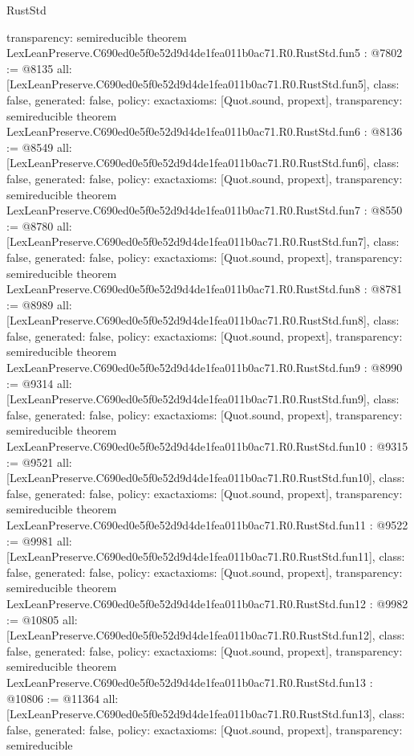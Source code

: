 \begin{lexlean}{RustStd}
\begin{coremodule}
{  transparency: semireducible
}
theorem LexLeanPreserve.C690ed0e5f0e52d9d4de1fea011b0ac71.R0.RustStd.fun5 : @7802 := @8135 {
  all: [LexLeanPreserve.C690ed0e5f0e52d9d4de1fea011b0ac71.R0.RustStd.fun5],
  class: false,
  generated: false,
  policy: exact{axioms: [Quot.sound, propext]},
  transparency: semireducible
}
theorem LexLeanPreserve.C690ed0e5f0e52d9d4de1fea011b0ac71.R0.RustStd.fun6 : @8136 := @8549 {
  all: [LexLeanPreserve.C690ed0e5f0e52d9d4de1fea011b0ac71.R0.RustStd.fun6],
  class: false,
  generated: false,
  policy: exact{axioms: [Quot.sound, propext]},
  transparency: semireducible
}
theorem LexLeanPreserve.C690ed0e5f0e52d9d4de1fea011b0ac71.R0.RustStd.fun7 : @8550 := @8780 {
  all: [LexLeanPreserve.C690ed0e5f0e52d9d4de1fea011b0ac71.R0.RustStd.fun7],
  class: false,
  generated: false,
  policy: exact{axioms: [Quot.sound, propext]},
  transparency: semireducible
}
theorem LexLeanPreserve.C690ed0e5f0e52d9d4de1fea011b0ac71.R0.RustStd.fun8 : @8781 := @8989 {
  all: [LexLeanPreserve.C690ed0e5f0e52d9d4de1fea011b0ac71.R0.RustStd.fun8],
  class: false,
  generated: false,
  policy: exact{axioms: [Quot.sound, propext]},
  transparency: semireducible
}
theorem LexLeanPreserve.C690ed0e5f0e52d9d4de1fea011b0ac71.R0.RustStd.fun9 : @8990 := @9314 {
  all: [LexLeanPreserve.C690ed0e5f0e52d9d4de1fea011b0ac71.R0.RustStd.fun9],
  class: false,
  generated: false,
  policy: exact{axioms: [Quot.sound, propext]},
  transparency: semireducible
}
theorem LexLeanPreserve.C690ed0e5f0e52d9d4de1fea011b0ac71.R0.RustStd.fun10 : @9315 := @9521 {
  all: [LexLeanPreserve.C690ed0e5f0e52d9d4de1fea011b0ac71.R0.RustStd.fun10],
  class: false,
  generated: false,
  policy: exact{axioms: [Quot.sound, propext]},
  transparency: semireducible
}
theorem LexLeanPreserve.C690ed0e5f0e52d9d4de1fea011b0ac71.R0.RustStd.fun11 : @9522 := @9981 {
  all: [LexLeanPreserve.C690ed0e5f0e52d9d4de1fea011b0ac71.R0.RustStd.fun11],
  class: false,
  generated: false,
  policy: exact{axioms: [Quot.sound, propext]},
  transparency: semireducible
}
theorem LexLeanPreserve.C690ed0e5f0e52d9d4de1fea011b0ac71.R0.RustStd.fun12 : @9982 := @10805 {
  all: [LexLeanPreserve.C690ed0e5f0e52d9d4de1fea011b0ac71.R0.RustStd.fun12],
  class: false,
  generated: false,
  policy: exact{axioms: [Quot.sound, propext]},
  transparency: semireducible
}
theorem LexLeanPreserve.C690ed0e5f0e52d9d4de1fea011b0ac71.R0.RustStd.fun13 : @10806 := @11364 {
  all: [LexLeanPreserve.C690ed0e5f0e52d9d4de1fea011b0ac71.R0.RustStd.fun13],
  class: false,
  generated: false,
  policy: exact{axioms: [Quot.sound, propext]},
  transparency: semireducible
}
\end{coremodule}
\end{lexlean}
